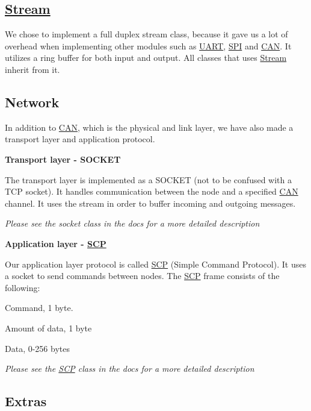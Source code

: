 \subsection*{\hyperlink{class_stream}{Stream}}

We chose to implement a full duplex stream class, because it gave us a lot of overhead when implementing other modules such as \hyperlink{class_u_a_r_t}{U\+A\+RT}, \hyperlink{namespace_s_p_i}{S\+PI} and \hyperlink{class_c_a_n}{C\+AN}. It utilizes a ring buffer for both input and output. All classes that uses \hyperlink{class_stream}{Stream} inherit from it.

\subsection*{Network}

In addition to \hyperlink{class_c_a_n}{C\+AN}, which is the physical and link layer, we have also made a transport layer and application protocol.

{\bfseries Transport layer -\/ S\+O\+C\+K\+ET}

The transport layer is implemented as a S\+O\+C\+K\+ET (not to be confused with a T\+CP socket). It handles communication between the node and a specified \hyperlink{class_c_a_n}{C\+AN} channel. It uses the stream in order to buffer incoming and outgoing messages.

{\itshape Please see the socket class in the docs for a more detailed description}

{\bfseries Application layer -\/ \hyperlink{class_s_c_p}{S\+CP}}

Our application layer protocol is called \hyperlink{class_s_c_p}{S\+CP} (Simple Command Protocol). It uses a socket to send commands between nodes. The \hyperlink{class_s_c_p}{S\+CP} frame consists of the following\+:


\begin{DoxyItemize}
\item Command, 1 byte.
\item Amount of data, 1 byte
\item Data, 0-\/256 bytes
\end{DoxyItemize}

{\itshape Please see the \hyperlink{class_s_c_p}{S\+CP} class in the docs for a more detailed description}

\subsection*{Extras}

